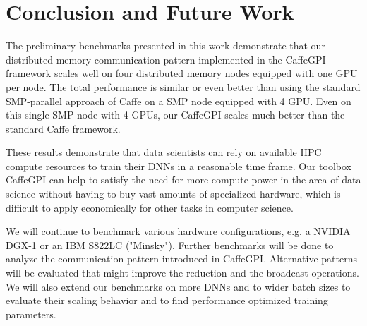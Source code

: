 \documentclass[twoside,twocolumn]{article}
\begin{document}



\section{Conclusion and Future Work}
\label{s:conclusion}

The preliminary benchmarks presented in this work demonstrate that our
distributed memory communication pattern implemented in the CaffeGPI framework
scales well on four distributed memory nodes equipped with one GPU per
node. The total performance is similar or even better than
using the standard SMP-parallel approach of Caffe on a SMP node equipped 
with 4  GPU.
Even on this single SMP node with 4 GPUs, our CaffeGPI scales much better
than the standard Caffe framework.

These results demonstrate that data scientists can rely on available HPC
compute resources to train their DNNs in a reasonable time frame. Our toolbox CaffeGPI
can help to satisfy the need for more compute power in the area of data science
without having to buy vast amounts of specialized hardware, which is difficult
to apply economically for other tasks in computer science.

We will continue to benchmark various hardware configurations,
e.g.  a NVIDIA DGX-1 or an IBM S822LC ("Minsky").
Further benchmarks will be done to
analyze the communication pattern introduced
in CaffeGPI. Alternative patterns will be evaluated
that might improve the reduction and the broadcast operations.
We will also extend our benchmarks on more
DNNs and to wider batch sizes to evaluate their scaling behavior and to find performance
optimized training parameters.
\end{document}
